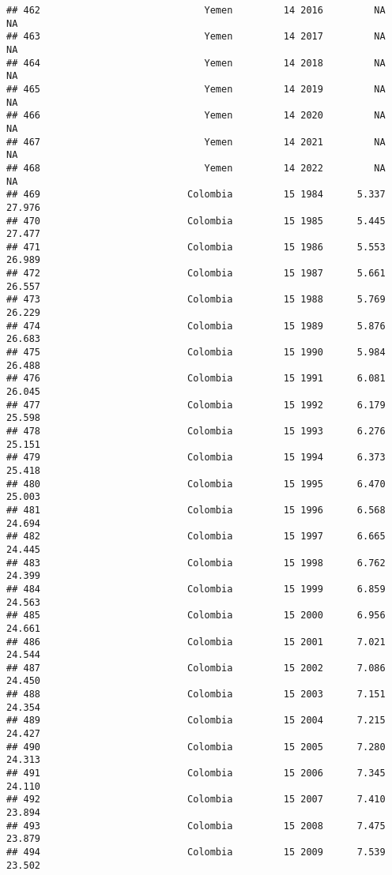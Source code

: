 \documentclass[
]{article}
\begin{document}
\begin{verbatim}
## 462                             Yemen         14 2016         NA         NA
## 463                             Yemen         14 2017         NA         NA
## 464                             Yemen         14 2018         NA         NA
## 465                             Yemen         14 2019         NA         NA
## 466                             Yemen         14 2020         NA         NA
## 467                             Yemen         14 2021         NA         NA
## 468                             Yemen         14 2022         NA         NA
## 469                          Colombia         15 1984      5.337     27.976
## 470                          Colombia         15 1985      5.445     27.477
## 471                          Colombia         15 1986      5.553     26.989
## 472                          Colombia         15 1987      5.661     26.557
## 473                          Colombia         15 1988      5.769     26.229
## 474                          Colombia         15 1989      5.876     26.683
## 475                          Colombia         15 1990      5.984     26.488
## 476                          Colombia         15 1991      6.081     26.045
## 477                          Colombia         15 1992      6.179     25.598
## 478                          Colombia         15 1993      6.276     25.151
## 479                          Colombia         15 1994      6.373     25.418
## 480                          Colombia         15 1995      6.470     25.003
## 481                          Colombia         15 1996      6.568     24.694
## 482                          Colombia         15 1997      6.665     24.445
## 483                          Colombia         15 1998      6.762     24.399
## 484                          Colombia         15 1999      6.859     24.563
## 485                          Colombia         15 2000      6.956     24.661
## 486                          Colombia         15 2001      7.021     24.544
## 487                          Colombia         15 2002      7.086     24.450
## 488                          Colombia         15 2003      7.151     24.354
## 489                          Colombia         15 2004      7.215     24.427
## 490                          Colombia         15 2005      7.280     24.313
## 491                          Colombia         15 2006      7.345     24.110
## 492                          Colombia         15 2007      7.410     23.894
## 493                          Colombia         15 2008      7.475     23.879
## 494                          Colombia         15 2009      7.539     23.502

\end{verbatim}
\end{document}
